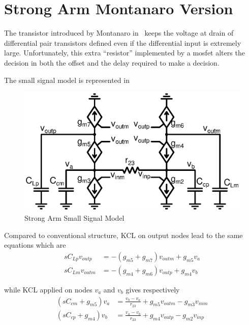 \section{Strong Arm Montanaro Version}
The transistor introduced by Montanaro in~\cite{Montanaro1996} keeps the voltage at drain of differential pair transistors defined even if the differential input is extremely large.
Unfortunately, this extra ``resistor'' implemented by a mosfet alters the decision in both the offset and the delay required to make a decision.

The small signal model is represented in 

\begin{figure}[htp]
    \centering
    \includegraphics[width=\textwidth]{Chapter7/Figs/sa_montanaro_small_signal_model.ps}
    \caption{Strong Arm Small Signal Model}
    \label{fig:annexe_sa_montanaro_small_signal}
\end{figure}

Compared to conventional structure, KCL on output nodes lead to the same equations which are
\begin{align}
    sC_{Lp} v_{outp} &= -(g_{m5}+g_{m7})v_{outm} + g_{m5}v_{a} \\
    sC_{Lm} v_{outm} &= -(g_{m4}+g_{m6})v_{outp} + g_{m4}v_{b}
\end{align}

while KCL applied on nodes \(v_a\) and \(v_b\) gives respectively
\begin{align}
    \label{eqn:annexe_va_vb_montanaro}
    \left(sC_{cm}+g_{m5}\right)v_a &= \frac{v_{b}-v_{a}}{r_{23}} + g_{m5}v_{outm} - g_{m3}v_{inm} \\
    \left(sC_{cp}+g_{m4}\right)v_b &= \frac{v_{a}-v_{b}}{r_{23}} + g_{m4}v_{outp} - g_{m2}v_{inp}
\end{align}

